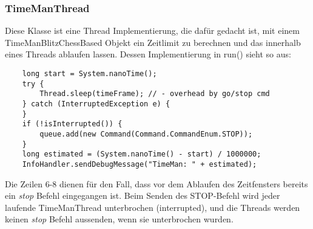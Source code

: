 \subsubsection{TimeManThread}
Diese Klasse ist eine Thread Implementierung, die dafür gedacht ist, mit einem TimeManBlitzChessBased Objekt ein Zeitlimit zu berechnen und das innerhalb eines Threads ablaufen lassen. Dessen Implementierung in run() sieht so aus: 
\lstset{
  numbers=left,
  stepnumber=1,    
  firstnumber=1,
  numberfirstline=true
}
\begin{lstlisting}
    long start = System.nanoTime();
    try {
        Thread.sleep(timeFrame); // - overhead by go/stop cmd
    } catch (InterruptedException e) {
    }
    if (!isInterrupted()) {
        queue.add(new Command(Command.CommandEnum.STOP));
    }
    long estimated = (System.nanoTime() - start) / 1000000;
    InfoHandler.sendDebugMessage("TimeMan: " + estimated);
\end{lstlisting}
Die Zeilen 6-8 dienen f\"ur den Fall, dass vor dem Ablaufen des Zeitfensters bereits ein \textit{stop} Befehl eingegangen ist. Beim Senden des STOP-Befehl wird jeder laufende TimeManThread unterbrochen (interrupted), und die Threads werden keinen \textit{stop} Befehl aussenden, wenn sie unterbrochen wurden.
